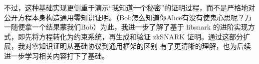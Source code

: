 \documentclass[a4paper]{article}
\begin{document}
  不过，这种基础实现更侧重于演示“我知道一个秘密”的证明过程，而不是严格地对公开方程本身构造通用零知识证明。（Bob怎么知道你Alice有没有使鬼心思呢？万一随便拿一个结果蒙我们Bob）为此，我进一步了解了基于
  libsnark 的进阶实现方式，即先将方程转化为约束系统，再生成和验证 zkSNARK 证明。通过这部分扩展，我对零知识证明从基础协议到通用框架的区别
  有了更清晰的理解，也为后续进一步学习相关内容打下了基础。
  

\newpage %
\renewcommand{\refname}{\Large\textbf{参考文献}} %
\end{document}
